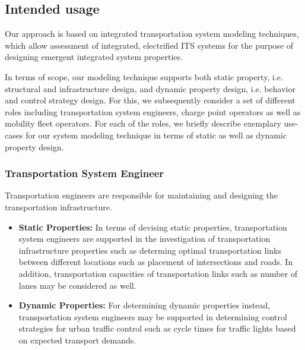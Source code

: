 \documentclass[a4paper,twoside]{article}
\begin{document}
	\subsection{Intended usage}
	\label{sec:scope}
	
	Our approach is based on integrated transportation system modeling techniques, which allow assessment of integrated, electrified ITS systems for the purpose of designing emergent integrated system properties.
	
	In terms of scope, our modeling technique supports both static property, i.e. structural and infrastructure design, and dynamic property design, i.e. behavior and control strategy design. For this, we subsequently consider a set of different roles including transportation system engineers, charge point operators as well as mobility fleet operators. For each of the roles, we briefly describe exemplary use-cases for our system modeling technique in terms of static as well as dynamic property design.

\subsubsection{Transportation System Engineer}
Transportation engineers are responsible for maintaining and designing the transportation infrastructure.


\begin{itemize}
	\item \textbf{Static Properties:} In terms of devising static properties, transportation system engineers are supported in the investigation of transportation infrastructure properties such as determing optimal transportation links between different locations such as placement of intersections and roads. In addition, transportation capacities of transportation links such as number of lanes may be considered as well.
	\item \textbf{Dynamic Properties:} For determining dynamic properties instead, transportation system engineers may be supported in determining control strategies for urban traffic control such as cycle times for traffic lights based on expected transport demands. 
\end{itemize}
	
\end{document}

